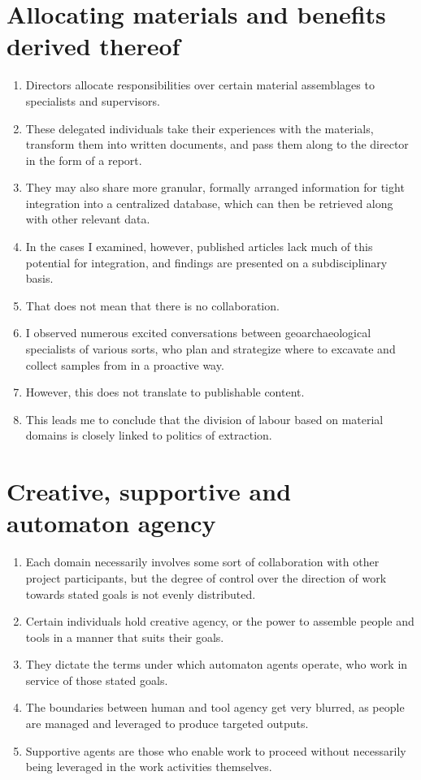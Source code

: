 \documentclass{article}
\begin{document}
\section{Allocating materials and benefits derived thereof}
\begin{enumerate}
  \item Directors allocate responsibilities over certain material assemblages to specialists and supervisors.
  \item These delegated individuals take their experiences with the materials, transform them into written documents, and pass them along to the director in the form of a report.
  \item They may also share more granular, formally arranged information for tight integration into a centralized database, which can then be retrieved along with other relevant data.
  \item In the cases I examined, however, published articles lack much of this potential for integration, and findings are presented on a subdisciplinary basis.
  \item That does not mean that there is no collaboration.
  \item I observed numerous excited conversations between geoarchaeological specialists of various sorts, who plan and strategize where to excavate and collect samples from in a proactive way.
  \item However, this does not translate to publishable content.
  \item This leads me to conclude that the division of labour based on material domains is closely linked to politics of extraction.
\end{enumerate}

\section{Creative, supportive and automaton agency}
\begin{enumerate}
  \item Each domain necessarily involves some sort of collaboration with other project participants, but the degree of control over the direction of work towards stated goals is not evenly distributed.
  \item Certain individuals hold creative agency, or the power to assemble people and tools in a manner that suits their goals.
  \item They dictate the terms under which automaton agents operate, who work in service of those stated goals.
  \item The boundaries between human and tool agency get very blurred, as people are managed and leveraged to produce targeted outputs.
  \item Supportive agents are those who enable work to proceed without necessarily being leveraged in the work activities themselves.
\end{enumerate}
\end{document}
